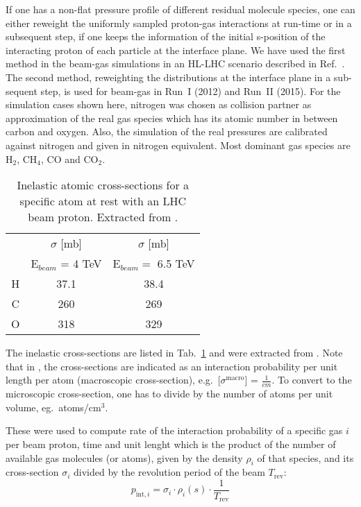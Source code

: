 If one has a non-flat pressure profile of different residual molecule species, one can either reweight the uniformly sampled proton-gas interactions at run-time or in a subsequent step, if one keeps the information of the initial s-position of the interacting proton of each particle at the interface plane. We have used the first method in the beam-gas simulations in an HL-LHC scenario described in Ref.~\cite{kweeIpac14}. The second method, reweighting the distributions at the interface plane in a sub-sequent step, is used for beam-gas in Run~I (2012) and Run~II (2015). For the simulation cases shown here, nitrogen was chosen as collision partner as approximation of the real gas species which has its atomic number in between carbon and oxygen. Also, the simulation of the real pressures are calibrated against nitrogen and given in nitrogen equivalent. Most dominant gas species are H$_2$, CH$_4$, CO and CO$_2$.

\begin{table}
   \centering
   \caption{Inelastic atomic cross-sections for a specific atom at rest with an LHC beam proton. Extracted from \fluka.}
   \begin{tabular}{c|c|c}\hline
     &  $\sigma$ [mb] &  $\sigma$ [mb] \\
       & E$_{beam}$ = 4 TeV   & E$_{beam} =$ 6.5 TeV \\ \hline\hline
       H & 37.1 & 38.4 \\
       C & 260& 269 \\
       O & 318 & 329 \\
       \hline
   \end{tabular}
   \label{tab:atomicXsections}
\end{table}

The inelastic cross-sections are listed in Tab.~\ref{tab:atomicXsections} and were extracted from \fluka. Note that in \fluka, the cross-sections are indicated as an interaction probability per unit length per atom (macroscopic cross-section), e.g.~[$\sigma^{\textrm{macro}}$] = $\frac{1}{cm}$. To convert to the microscopic cross-section, one has to divide by the number of atoms per unit volume, eg.~atoms/cm$^3$.

These were used to compute rate of the interaction probability of a specific gas $i$ per beam proton, time and unit lenght which is the product of the number of available gas molecules (or atoms), given by the density $\rho_i$ of that species, and its cross-section $\sigma_i$ divided by the revolution period of the beam $T_{\mathrm{rev}}$:
\begin{equation} \label{eq2}
p_{\mathrm{int},i} = \sigma_{i} \cdot \rho_{i}(s) \cdot \frac{1}{T_{\mathrm{rev}}}
\end{equation}


